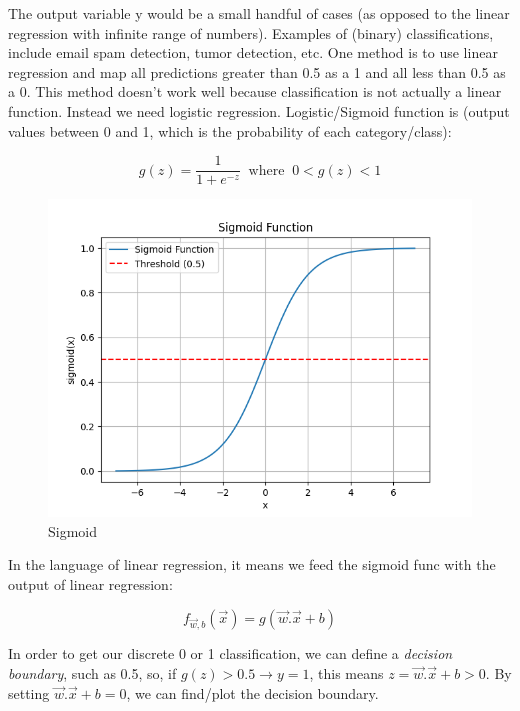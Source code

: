 \documentclass[12pt]{report}
\begin{document}
The output variable y would be a small handful of cases (as opposed to the linear regression with infinite range of numbers). Examples of (binary) classifications, include email spam detection, tumor detection, etc.  One method is to use linear regression and map all predictions greater than 0.5 as a 1 and all less than 0.5 as a 0. This method doesn't work well because classification is not actually a linear function. Instead we need logistic regression. Logistic/Sigmoid function is (output values between 0 and 1, which is the probability of each category/class):

\begin{equation}
g(z) = \frac{1}{1+e^{-z}} \;\; \text{where} \;\; 0<g(z)<1
\end{equation}

\begin{figure}[H]
  \centering
  \includegraphics[trim =0.0cm 0.0cm 0.0cm 0.0cm, clip, scale=0.5]{pics/sigmoid.png}
  \caption{Sigmoid}
\end{figure}

In the language of linear regression, it means we feed the sigmoid func with the output of linear regression:

\begin{equation}
  f_{\overrightarrow{w},b}(\overrightarrow{x}) = g(\overrightarrow{w} . \overrightarrow{x}+b)
\end{equation}

In order to get our discrete 0 or 1 classification, we can define a \textit{decision boundary}, such as 0.5, so, if $g(z) > 0.5 \rightarrow y=1$, this means $ z= \overrightarrow{w} . \overrightarrow{x}+b>0$. By setting $\overrightarrow{w} . \overrightarrow{x}+b =0$, we can find/plot the decision boundary.
\end{document}
